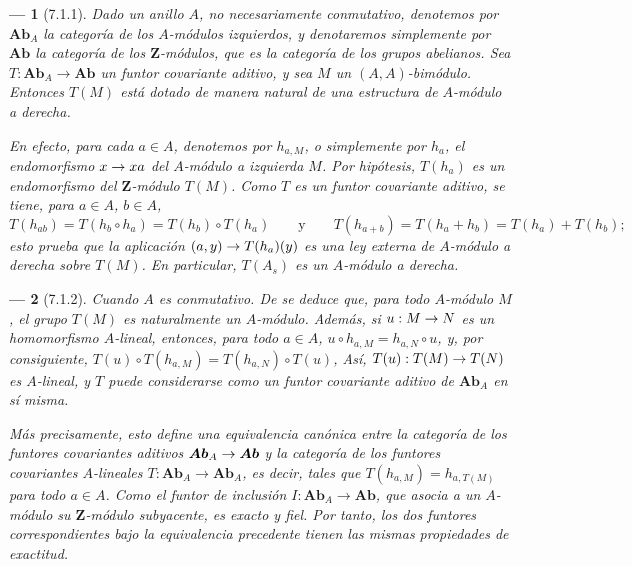 \documentclass[10pt,oneside,openany]{book}
\theoremstyle{egaenv}\newtheorem*{env}{---}
\theoremstyle{egastatement}
\theoremstyle{egadescription}
\renewcommand{\to}{\mathchoice{\longrightarrow}{\rightarrow}{\rightarrow}{\rightarrow}}
\begin{document}
\begin{env}[7.1.1]
\label{III.7.1.1}
Dado un anillo $A$, no necesariamente conmutativo, denotemos por
$\boldsymbol{Ab}_A$ la categoría de los $A$-\emph{módulos izquierdos}, y denotaremos simplemente por $\boldsymbol{Ab}$ la categoría de los $\mathbf Z$-módulos,
que es la categoría de los grupos abelianos. Sea
$T:\boldsymbol{Ab}_A\longrightarrow\boldsymbol{Ab}$
un \emph{funtor covariante aditivo}, y sea $M$ un $(A,A)$-\emph{bimódulo}.
Entonces $T(M)$ está dotado de manera natural de una estructura de
$A$-\emph{módulo a derecha}.

En efecto, para cada $a\in A$, denotemos por $h_{a,M}$, o
simplemente por $h_a$, el endomorfismo
$x\to xa$
del $A$-módulo \emph{a izquierda} $M$. Por hipótesis, $T(h_a)$ es un
endomorfismo del $\mathbf Z$-\emph{módulo} $T(M)$. Como $T$ es un funtor covariante aditivo, se tiene, para $a\in A$, $b\in A$,
\[
  T(h_{ab})
  =
  T(h_b\circ h_a)
  =
  T(h_b)\circ T(h_a)
  \qquad\text{y}\qquad
  T(h_{a+b})
  =
  T(h_a+h_b)
  =
  T(h_a)+T(h_b);
\]
esto prueba que la aplicación $(a,y)\to T(h_a)(y)$
es una ley externa de $A$-módulo a derecha sobre
$T(M)$. En particular, $T(A_s)$ es un $A$-\emph{módulo a derecha}.
\end{env}

\begin{env}[7.1.2]
Cuando $A$ es \emph{conmutativo}. De  se deduce
que, para todo $A$-módulo $M$, el grupo $T(M)$ es naturalmente un
$A$-módulo. Además, si $u:M\to N$ es un homomorfismo
$A$-lineal, entonces, para todo $a\in A$,
$u\circ h_{a,M}=h_{a,N}\circ u$,
y, por consiguiente,
$T(u)\circ T(h_{a,M})=T(h_{a,N})\circ T(u)$,
Así, $T(u):T(M)\to T(N)$ es $A$-\emph{lineal}, y $T$ puede considerarse
como un funtor covariante aditivo de $\boldsymbol{Ab}_A$ en sí misma.

Más precisamente, esto define una \emph{equivalencia} canónica entre la
categoría de los funtores covariantes aditivos
$\boldsymbol{Ab}_A\to\boldsymbol{Ab}$
y la categoría de los funtores covariantes $A$-\emph{lineales}
$T:\boldsymbol{Ab}_A\longrightarrow\boldsymbol{Ab}_A$,
es decir, tales que
$T(h_{a,M})=h_{a,T(M)}$ para todo $a\in A$.
Como el funtor de inclusión $I:\boldsymbol{Ab}_A\longrightarrow\boldsymbol{Ab}$,
que asocia a un $A$-módulo su $\mathbf Z$-módulo subyacente, es exacto
y fiel. Por tanto, los dos funtores correspondientes bajo la
equivalencia precedente tienen las mismas propiedades de exactitud.
\end{env}
\end{document}
